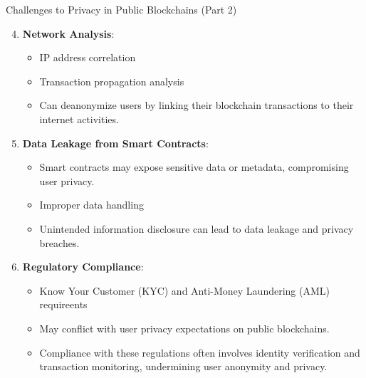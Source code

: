 \begin{withoutheadline}
\begin{frame}{Challenges to Privacy in Public Blockchains (Part 2)}
    \begin{enumerate}
        \setcounter{enumi}{3}
        \item \textbf{Network Analysis}:
            \begin{itemize}
                \item IP address correlation
                \item Transaction propagation analysis
                \item Can deanonymize users by linking their blockchain transactions to their internet activities.
            \end{itemize}
        
        \item \textbf{Data Leakage from Smart Contracts}:
            \begin{itemize}
                \item Smart contracts may expose sensitive data or metadata, compromising user privacy.
                \item Improper data handling
                \item Unintended information disclosure can lead to data leakage and privacy breaches.
            \end{itemize}
        
        \item \textbf{Regulatory Compliance}:
            \begin{itemize}
                \item Know Your Customer (KYC) and Anti-Money Laundering (AML) requireents
                \item May conflict with user privacy expectations on public blockchains.
                \item Compliance with these regulations often involves identity verification and transaction monitoring, undermining user anonymity and privacy.
            \end{itemize}
    \end{enumerate}
\end{frame}


\end{withoutheadline}
